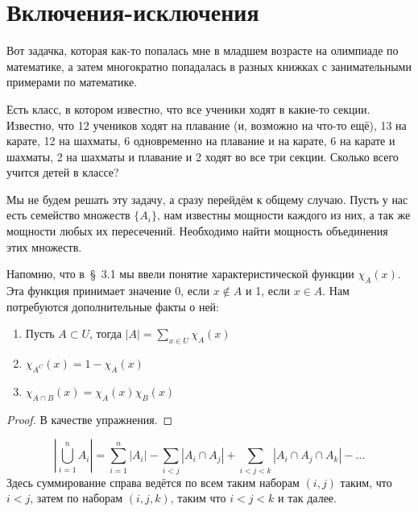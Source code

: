 \section{Включения-исключения}

Вот задачка, которая как-то попалась мне в младшем возрасте на олимпиаде по математике, а затем многократно попадалась в разных книжках с занимательными примерами по математике.

Есть класс, в котором известно, что все ученики ходят в какие-то секции. Известно, что 12 учеников ходят на плавание (и, возможно на что-то ещё), 13 на карате, 12 на шахматы, 6 одновременно на плавание и на карате, 6 на карате и шахматы, 2 на шахматы и плавание и 2 ходят во все три секции. Сколько всего учится детей в классе?

Мы не будем решать эту задачу, а сразу перейдём к общему случаю. Пусть у нас есть семейство множеств $\{A_i\}$, нам известны мощности каждого из них, а так же мощности любых их пересечений. Необходимо найти мощность объединения этих множеств.

Напомню, что в~\S~3.1 мы ввели понятие характеристической функции $\chi_A(x)$. Эта функция принимает значение 0, если $x\not\in A$ и 1, если $x\in A$. Нам потребуются дополнительные факты о ней:

\begin{thm}
\begin{enumerate}
\item Пусть $A\subset U$, тогда $|A| = \sum_{x\in U} \chi_A(x)$
\item $\chi_{A^C}(x) = 1 - \chi_A(x)$
\item $\chi_{A\cap B}(x) = \chi_A(x)\chi_B(x)$ 
\end{enumerate}
\end{thm}
\begin{proof}
В качестве упражнения.
\end{proof}

\begin{thm}
$$\left|\bigcup_{i=1}^n A_i \right|= \sum_{i=1}^n|A_i| - \sum_{i<j}|A_i\cap A_j| + \sum_{i<j<k}|A_i\cap A_j\cap A_k| -\ldots$$
Здесь суммирование справа ведётся по всем таким наборам $(i, j)$ таким, что $i<j$, затем по наборам $(i,j,k)$, таким что $i<j<k$ и так далее.
\end{thm}

